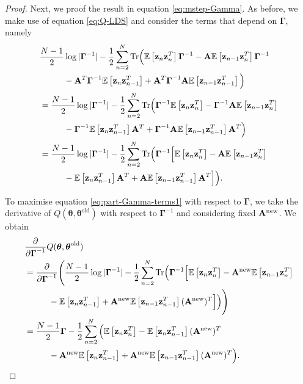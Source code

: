 \documentclass[11pt]{article}
\numberwithin{equation}{section}
\newcommand{\expectation}[1]{\mathbb{E}\left[#1\right]}
\newcommand{\z}{{\bf z}}
\begin{document}
\begin{proof}
	Next, we proof the result in equation \eqref{eq:mstep-Gamma}. As before, we make use of equation \eqref{eq:Q-LDS} and consider the terms that depend on $\boldsymbol{\Gamma}$, namely
	\begin{align}
		& \frac{N-1}{2}\log\vert\boldsymbol\Gamma^{-1}\vert -\frac{1}{2}\sum_{n=2}^N\text{Tr}\Big(\expectation{\z_n\z_n^T}\boldsymbol\Gamma^{-1} - {\bf A}\expectation{\z_{n-1}\z_n^T}\boldsymbol\Gamma^{-1} \nonumber\\
		&\hspace{1cm} - {\bf A}^T\boldsymbol{\Gamma}^{-1} \expectation{\z_n\z_{n-1}^T} + {\bf A}^T\boldsymbol\Gamma^{-1}{\bf A} \expectation{\z_{n-1}\z_{n-1}^T}\Big) \nonumber\\
		&= \frac{N-1}{2}\log\vert\boldsymbol\Gamma^{-1}\vert -\frac{1}{2}\sum_{n=2}^N\text{Tr}\Big( \boldsymbol{\Gamma}^{-1}\expectation{\z_n\z_n^T} - \boldsymbol{\Gamma}^{-1}{\bf A}\expectation{\z_{n-1}\z_n^T} \nonumber \\
		&\hspace{1cm} -\boldsymbol{\Gamma}^{-1}\expectation{\z_{n}\z_{n-1}^T}{\bf A}^T + \boldsymbol{\Gamma}^{-1} {\bf A}\expectation{\z_{n-1}\z_{n-1}^T}{\bf A}^T\Big) \nonumber\\
		&= \frac{N-1}{2}\log\vert\boldsymbol\Gamma^{-1}\vert -\frac{1}{2}\sum_{n=2}^N\text{Tr}\Big(\boldsymbol{\Gamma}^{-1}\Big[\expectation{\z_n\z_n^T} - {\bf A}\expectation{\z_{n-1}\z_n^T} \nonumber \\
		&\hspace{1cm} -\expectation{\z_n\z_{n-1}^T}{\bf A}^T + {\bf A}\expectation{\z_{n-1}\z_{n-1}^T}{\bf A}^T \Big]\Big) \label{eq:part-Gamma-terms1}.
	\end{align}
	
	To maximise equation \eqref{eq:part-Gamma-terms1} with respect to $\boldsymbol{\Gamma}$, we take the derivative of $Q(\boldsymbol\theta, \boldsymbol\theta^\text{old})$ with respect to $\boldsymbol{\Gamma}^{-1}$ and considering fixed ${\bf A}^{\text{new}}$. We obtain
	\begin{align}
		&\frac{\partial}{\partial \boldsymbol{\Gamma}^{-1}}Q(\boldsymbol\theta, \boldsymbol\theta^{\text{old}}) \\
		&= \frac{\partial}{\partial \boldsymbol{\Gamma}^{-1}}\Bigg(\frac{N-1}{2}\log\vert\boldsymbol\Gamma^{-1}\vert -\frac{1}{2}\sum_{n=2}^N\text{Tr}\Big(\boldsymbol{\Gamma}^{-1}\Big[\expectation{\z_n\z_n^T} - {\bf A}^{\text{new}}\expectation{\z_{n-1}\z_n^T} \nonumber \\
		&\hspace{1cm} -\expectation{\z_n\z_{n-1}^T} + {\bf A}^{\text{new}}\expectation{\z_{n-1}\z_{n-1}^T}({\bf A}^{\text{new}})^T \Big]\Big)\Bigg) \\
		&= \frac{N-1}{2}\boldsymbol\Gamma -\frac{1}{2}\sum_{n=2}^N\Big(\expectation{\z_n\z_n^T} - \expectation{\z_n\z_{n-1}^T}({\bf A}^{\text{new}})^T  \nonumber \\
		& \hspace{1cm} - {\bf A}^{\text{new}}\expectation{\z_n\z_{n-1}^T} + {\bf A}^{\text{new}}\expectation{\z_{n-1}\z_{n-1}^T}({\bf A}^{\text{new}})^T\Big). \label{eq:part-Gamma-terms2}
	\end{align}
	

\end{proof}
\end{document}
